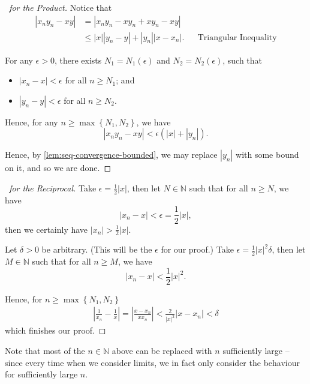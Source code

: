 \documentclass[11pt]{article}
\numberwithin{equation}{section}
\theoremstyle{definition}
\theoremstyle{remark}
\newcommand{\pqty}[1]{\left(#1\right)}
\newcommand{\Bqty}[1]{\left\{#1\right\}}
\newcommand{\abs}[1]{\left|#1\right|}
\newcommand{\NN}{\mathbb N}
\begin{document}
\begin{proof}[\proofname\ for the Product]
    Notice that
    \begin{align*}
        \abs{x_n y_n - xy} &= \abs{x_n y_n - x y_n + x y_n - xy} \\
        &\leq \abs{x} \abs{y_n - y} + \abs{y_n} \abs{x - x_n}. && \text{Triangular Inequality}
    \end{align*}

    For any \(\epsilon > 0\), there exists \(N_1 = N_1 \pqty{\epsilon}\) and \(N_2 = N_2 \pqty{\epsilon}\), such that
    \begin{itemize}
        \item \(\abs{x_n - x} < \epsilon\) for all \(n \geq N_1\); and
        \item \(\abs{y_n - y} < \epsilon\) for all \(n \geq N_2\).
    \end{itemize}

    Hence, for any \(n \geq \max\Bqty{N_1, N_2}\), we have
    \[
        \abs{x_n y_n - xy} < \epsilon \pqty{\abs{x} + \abs{y_n}}.
    \]

    Hence, by \autoref{lem:seq-convergence-bounded}, we may replace \(\abs{y_n}\) with some bound on it, and so we are done.
\end{proof}

\begin{proof}[\proofname\ for the Reciprocal]
    Take \(\epsilon = \frac{1}{2} \abs{x}\), then let \(N \in \NN\) such that for all \(n \geq N\), we have
    \[
        \abs{x_n - x} < \epsilon = \frac{1}{2} \abs{x},
    \]
    then we certainly have \(\abs{x_n} > \frac{1}{2} \abs{x}\).

    Let \(\delta > 0\) be arbitrary. (This will be the \(\epsilon\) for our proof.) Take \(\epsilon = \frac{1}{2} \abs{x}^2 \delta\), then let \(M \in \NN\) such that for all \(n \geq M\), we have
    \[
        \abs{x_n - x} < \frac{1}{2} \abs{x}^2.
    \]

    Hence, for \(n \geq \max\Bqty{N_1, N_2}\)
    \begin{align*}
        \abs{\frac{1}{x_n} - \frac{1}{x}} = \abs{\frac{x - x_n}{x x_n}} < \frac{2}{\abs{x}^2} \abs{x - x_n} < \delta
    \end{align*}
    which finishes our proof.
\end{proof}

Note that most of the \(n \in \NN\) above can be replaced with \(n\) sufficiently large -- since every time when we consider limits, we in fact only consider the behaviour for sufficiently large \(n\).
\end{document}
